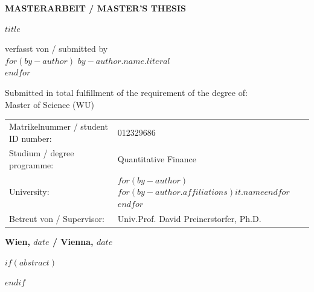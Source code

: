 \begin{center}
    \textbf{\huge MASTERARBEIT / MASTER’S THESIS} \\
    \vspace{1.5cm}

    \LARGE $title$ \\
    \vspace{2.5cm}
    
    \normalsize verfasst von / submitted by \\
    \vspace{0.5cm}
    $for(by-author)$
    \textit{\Large $by-author.name.literal$ \\}
    $endfor$
    \vspace{2cm}
    
    Submitted in total fulfillment of the requirement of the degree of: \\
    \Large Master of Science (WU)
        \\
\vspace{1cm}
\normalsize

    \begin{tabular}{ll}
        Matrikelnummer / student ID number: & 012329686 \\
        Studium / degree programme: & Quantitative Finance \\
        University: & $for(by-author)$$for(by-author.affiliations)$$it.name$$endfor$$endfor$ \\
        Betreut von / Supervisor: & Univ.Prof. David Preinerstorfer, Ph.D. \\
    \end{tabular}
    \vspace{2cm}
    
    \textbf{Wien, $date$ / Vienna, $date$}
\end{center}

\restoregeometry


$if(abstract)$
\begin{abstract}
$abstract$
\end{abstract}
$endif$